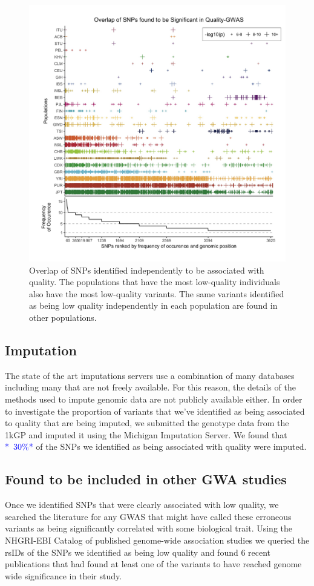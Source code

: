 \documentclass[9pt,lineno]{elife}
\newcommand{\todo}[1]{\textcolor{blue}{*#1*}}
\begin{document}
\begin{figure}
\includegraphics[width=\hsize,keepaspectratio]{SNPOverlap6.jpg}

\caption{Overlap of SNPs identified independently to be associated with quality. 
The populations that have the most low-quality individuals also have the most low-quality variants. 
The same variants identified as being low quality independently in each population are found in other populations. }
  \label{OverLap}
\end{figure}

	\subsection{Imputation}
The state of the art imputations servers use a combination of many databases including many that are not freely available.
For this reason, the details of the methods used to impute genomic data are not publicly available either.
In order to investigate the proportion of variants that we've identified as being associated to quality that are being imputed, we submitted the genotype data from the 1kGP and imputed it using the Michigan Imputation Server.
We found that \todo{~30\%} of the SNPs we identified as being associated with quality were imputed.

	\subsection{Found to be included in other GWA studies}
Once we identified SNPs that were clearly associated with low quality, we searched the literature for any GWAS that might have called these erroneous variants as being significantly correlated with some biological trait. 
Using the NHGRI-EBI Catalog of published genome-wide association studies we queried the rsIDs of the SNPs we identified as being low quality and found 6 recent publications that had found at least one of the variants to have reached genome wide significance in their study. 
\end{document}

